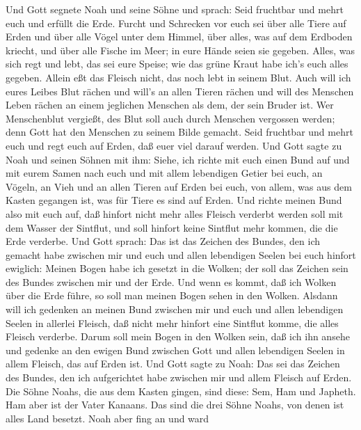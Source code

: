  Und Gott segnete Noah und seine Söhne und sprach: Seid
fruchtbar und mehrt euch und erfüllt die Erde.  Furcht und
Schrecken vor euch sei über alle Tiere auf Erden und über alle Vögel
unter dem Himmel, über alles, was auf dem Erdboden kriecht, und über
alle Fische im Meer; in eure Hände seien sie gegeben. 
Alles, was sich regt und lebt, das sei eure Speise; wie das grüne Kraut
habe ich's euch alles gegeben.  Allein eßt das Fleisch
nicht, das noch lebt in seinem Blut.  Auch will ich eures
Leibes Blut rächen und will's an allen Tieren rächen und will des
Menschen Leben rächen an einem jeglichen Menschen als dem, der sein
Bruder ist.  Wer Menschenblut vergießt, des Blut soll auch
durch Menschen vergossen werden; denn Gott hat den Menschen zu seinem
Bilde gemacht.  Seid fruchtbar und mehrt euch und regt euch
auf Erden, daß euer viel darauf werden.  Und Gott sagte zu
Noah und seinen Söhnen mit ihm:  Siehe, ich richte mit euch
einen Bund auf und mit eurem Samen nach euch  und mit allem
lebendigen Getier bei euch, an Vögeln, an Vieh und an allen Tieren auf
Erden bei euch, von allem, was aus dem Kasten gegangen ist, was für
Tiere es sind auf Erden.  Und richte meinen Bund also mit
euch auf, daß hinfort nicht mehr alles Fleisch verderbt werden soll mit
dem Wasser der Sintflut, und soll hinfort keine Sintflut mehr kommen,
die die Erde verderbe.  Und Gott sprach: Das ist das
Zeichen des Bundes, den ich gemacht habe zwischen mir und euch und allen
lebendigen Seelen bei euch hinfort ewiglich:  Meinen Bogen
habe ich gesetzt in die Wolken; der soll das Zeichen sein des Bundes
zwischen mir und der Erde.  Und wenn es kommt, daß ich
Wolken über die Erde führe, so soll man meinen Bogen sehen in den
Wolken.  Alsdann will ich gedenken an meinen Bund zwischen
mir und euch und allen lebendigen Seelen in allerlei Fleisch, daß nicht
mehr hinfort eine Sintflut komme, die alles Fleisch verderbe.
 Darum soll mein Bogen in den Wolken sein, daß ich ihn
ansehe und gedenke an den ewigen Bund zwischen Gott und allen lebendigen
Seelen in allem Fleisch, das auf Erden ist.  Und Gott sagte
zu Noah: Das sei das Zeichen des Bundes, den ich aufgerichtet habe
zwischen mir und allem Fleisch auf Erden.  Die Söhne Noahs,
die aus dem Kasten gingen, sind diese: Sem, Ham und Japheth. Ham aber
ist der Vater Kanaans.  Das sind die drei Söhne Noahs, von
denen ist alles Land besetzt.  Noah aber fing an und ward
